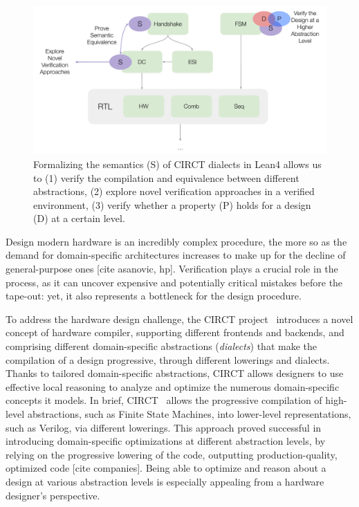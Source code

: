 \documentclass[sigconf,authorversion,nonacm, 11pt]{acmart}
\begin{document}
\begin{figure}[ht]
    \includegraphics[scale=0.8]{semantics.pdf}
    \caption{Formalizing the semantics (S) of CIRCT dialects in Lean4 allows us to (1) verify the compilation and equivalence 
    between different abstractions, (2) explore novel verification approaches in a verified environment, (3) verify whether a property  %
    (P) holds for a design (D) at a certain level.}
\end{figure}

Design modern hardware is an incredibly complex procedure, 
the more so as the demand for domain-specific architectures increases
to make up for the decline of general-purpose ones [cite asanovic, hp]. 
Verification plays a crucial role in the process, as it can uncover 
expensive and potentially critical mistakes before the tape-out: yet, 
it also represents a bottleneck for the design procedure. 

To address the hardware design challenge, the CIRCT project~\cite{circt, mlir_circt} introduces 
a novel concept of hardware compiler, supporting different frontends and backends, and comprising 
different domain-specific abstractions (\textit{dialects}) that make 
the compilation of a design progressive, 
through different lowerings and dialects. 
Thanks to tailored domain-specific abstractions, CIRCT allows designers to use effective 
local reasoning to analyze and optimize the numerous domain-specific concepts it models.
In brief, CIRCT~\cite{circt, mlir_circt} allows the progressive compilation of high-level abstractions, such as Finite State Machines, into lower-level representations, 
such as Verilog, via different lowerings. 
This approach proved successful in introducing domain-specific optimizations at different abstraction levels, 
by relying on the progressive lowering of the code, outputting production-quality, optimized code [cite companies]. 
Being able to optimize and reason about a design at various abstraction levels is especially appealing from a hardware 
designer's perspective. 
\end{document}

